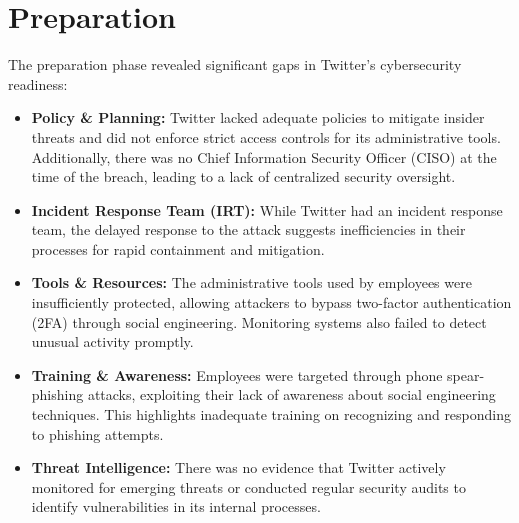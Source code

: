 \documentclass[11pt]{book}
\begin{document}
\section{Preparation}
The preparation phase revealed significant gaps in Twitter's cybersecurity readiness:
\begin{itemize}
    \item \textbf{Policy \& Planning:} Twitter lacked adequate policies to mitigate insider threats and did not enforce strict access controls for its administrative tools. Additionally, there was no Chief Information Security Officer (CISO) at the time of the breach, leading to a lack of centralized security oversight.
    \item \textbf{Incident Response Team (IRT):} While Twitter had an incident response team, the delayed response to the attack suggests inefficiencies in their processes for rapid containment and mitigation.
    \item \textbf{Tools \& Resources:} The administrative tools used by employees were insufficiently protected, allowing attackers to bypass two-factor authentication (2FA) through social engineering. Monitoring systems also failed to detect unusual activity promptly.
    \item \textbf{Training \& Awareness:} Employees were targeted through phone spear-phishing attacks, exploiting their lack of awareness about social engineering techniques. This highlights inadequate training on recognizing and responding to phishing attempts.
    \item \textbf{Threat Intelligence:} There was no evidence that Twitter actively monitored for emerging threats or conducted regular security audits to identify vulnerabilities in its internal processes.
\end{itemize}
\end{document}
